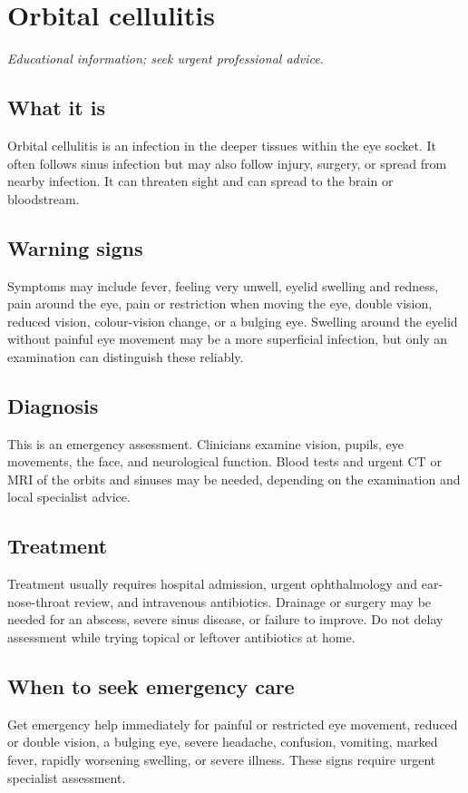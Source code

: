 \chapter{Orbital cellulitis}

\medskip
\noindent\textit{Educational information; seek urgent professional advice.}

\section*{What it is}
Orbital cellulitis is an infection in the deeper tissues within the eye socket. It often follows sinus infection but may also follow injury, surgery, or spread from nearby infection. It can threaten sight and can spread to the brain or bloodstream.

\section*{Warning signs}
Symptoms may include fever, feeling very unwell, eyelid swelling and redness, pain around the eye, pain or restriction when moving the eye, double vision, reduced vision, colour-vision change, or a bulging eye. Swelling around the eyelid without painful eye movement may be a more superficial infection, but only an examination can distinguish these reliably.

\section*{Diagnosis}
This is an emergency assessment. Clinicians examine vision, pupils, eye movements, the face, and neurological function. Blood tests and urgent CT or MRI of the orbits and sinuses may be needed, depending on the examination and local specialist advice.

\section*{Treatment}
Treatment usually requires hospital admission, urgent ophthalmology and ear-nose-throat review, and intravenous antibiotics. Drainage or surgery may be needed for an abscess, severe sinus disease, or failure to improve. Do not delay assessment while trying topical or leftover antibiotics at home.

\section*{When to seek emergency care}
Get emergency help immediately for painful or restricted eye movement, reduced or double vision, a bulging eye, severe headache, confusion, vomiting, marked fever, rapidly worsening swelling, or severe illness. These signs require urgent specialist assessment.

